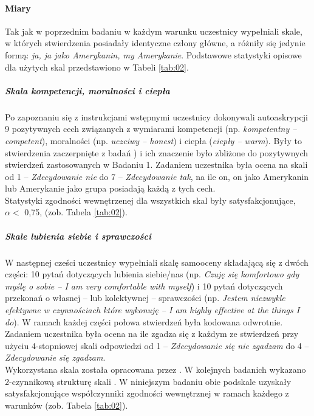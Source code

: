 \documentclass[man]{apa6}
\begin{document}
\paragraph{Miary}
Tak jak w poprzednim badaniu w każdym warunku uczestnicy wypełniali skale, w których stwierdzenia posiadały identyczne człony główne, a różniły się jedynie formą: \emph{ja, ja jako Amerykanin, my Amerykanie}. Podstawowe statystyki opisowe dla użytych skal przedstawiono w Tabeli \ref{tab:02}.

\subparagraph{Skala kompetencji, moralności i ciepła}
Po zapoznaniu się z instrukcjami wstępnymi uczestnicy dokonywali autoaskrypcji 9 pozytywnych cech związanych z wymiarami kompetencji (np. \emph{kompetentny -- competent}), moralności (np. \emph{uczciwy -- honest}) i ciepła (\emph{ciepły -- warm}). Były to stwierdzenia zaczerpnięte z badań \textcite{leach2007group}) i ich znaczenie było zbliżone do pozytywnych stwierdzeń zastosowanych w Badaniu 1. Zadaniem uczestnika była ocena na skali od 1 -- \emph{Zdecydowanie nie} do 7 -- \emph{Zdecydowanie tak}, na ile on, on jako Amerykanin lub Amerykanie jako grupa posiadają każdą z tych cech. \\
Statystyki zgodności wewnętrzenej dla wszystkich skal były satysfakcjonujące, $\alpha <$ 0,75, (zob. Tabela \ref{tab:02}). \\
\subparagraph{Skale lubienia siebie i sprawczości}
W następnej cześci uczestnicy wypełniali skalę samooceny składającą się z dwóch części: 10 pytań dotyczących lubienia siebie/nas (np. \emph{Czuję się komfortowo gdy myślę o sobie -- I am very comfortable with myself}) i 10 pytań dotyczących przekonań o własnej -- lub kolektywnej -- sprawczości (np. \emph{Jestem niezwykle efektywne w czynnościach które wykonuję -- I am highly effective at the things I do}). W ramach każdej części połowa stwierdzeń była kodowana odwrotnie. Zadaniem uczestnika była ocena na ile zgadza się z każdym ze stwierdzeń przy użyciu 4-stopniowej skali odpowiedzi od 1 -- \emph{Zdecydowanie się nie zgadzam} do 4 -- \emph{Zdecydowanie się zgadzam}.\\
Wykorzystana skala została opracowana przez \textcite{tafarodi1995self}. W kolejnych badanich wykazano 2-czynnikową strukturę skali \parencite{tafarodi2002decomposing}. W niniejszym badaniu obie podskale uzyskały satysfakcjonujące współczynniki zgodności wewnętrznej w ramach każdego z warunków (zob. Tabela \ref{tab:02}).
\end{document}
